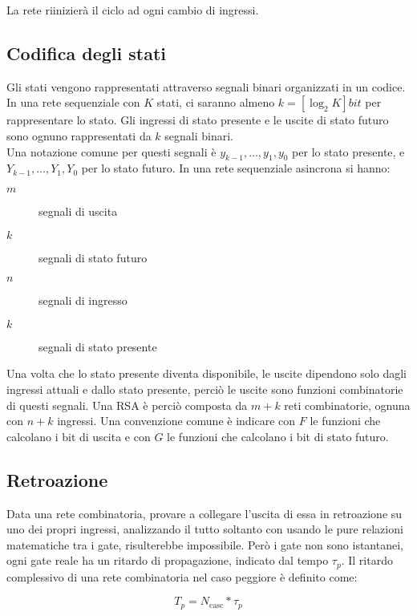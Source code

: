 \documentclass{subfiles}
\begin{document}
\noindent
La rete riinizierà il ciclo ad ogni cambio di ingressi.

\subsection{Codifica degli stati}

Gli stati vengono rappresentati attraverso segnali binari organizzati in un codice.
In una rete sequenziale con $K$ stati, ci saranno almeno $k = [\log_2 K] bit$ per rappresentare lo stato.
Gli ingressi di stato presente e le uscite di stato futuro sono ognuno rappresentati da $k$ segnali binari.\\

\noindent
Una notazione comune per questi segnali è $y_{k-1}, \dots, y_1, y_0$ per lo stato presente, e $Y_{k-1}, \dots, Y_1, Y_0$ per lo stato futuro.
In una rete sequenziale asincrona si hanno:

\begin{description}
    \item[$m$] segnali di uscita
    \item[$k$] segnali di stato futuro
    \item[$n$] segnali di ingresso
    \item[$k$] segnali di stato presente
\end{description}

\noindent
Una volta che lo stato presente diventa disponibile, le uscite dipendono solo dagli ingressi attuali e dallo stato presente, perciò le uscite sono funzioni combinatorie di questi segnali.
Una RSA è perciò composta da $m+k$ reti combinatorie, ognuna con $n+k$ ingressi.
Una convenzione comune è indicare con $F$ le funzioni che calcolano i bit di uscita e con $G$ le funzioni che calcolano i bit di stato futuro.

\subsection{Retroazione}

Data una rete combinatoria, provare a collegare l'uscita di essa in retroazione su uno dei propri ingressi, analizzando il tutto soltanto con usando le pure relazioni matematiche tra i gate, risulterebbe impossibile.
Però i gate non sono istantanei, ogni gate reale ha un ritardo di propagazione, indicato dal tempo $\tau_p$.
Il ritardo complessivo di una rete combinatoria nel caso peggiore è definito come:

$$
T_p = N_{\text{casc}} * \tau_p
$$
\end{document}
